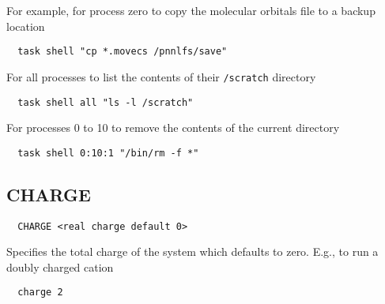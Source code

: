 For example, for process zero to copy the molecular orbitals file to a
backup location
\begin{verbatim}
  task shell "cp *.movecs /pnnlfs/save"
\end{verbatim}
For all processes to list the contents of their \verb+/scratch+
directory
\begin{verbatim}
  task shell all "ls -l /scratch"
\end{verbatim}
For processes 0 to 10 to remove the contents of the current directory
\begin{verbatim}
  task shell 0:10:1 "/bin/rm -f *"
\end{verbatim}

\subsection{CHARGE}
\label{sec:charge}

\begin{verbatim}
  CHARGE <real charge default 0>
\end{verbatim}

Specifies the total charge of the system which defaults to zero.
E.g., to run a doubly charged cation
\begin{verbatim}
  charge 2
\end{verbatim}
